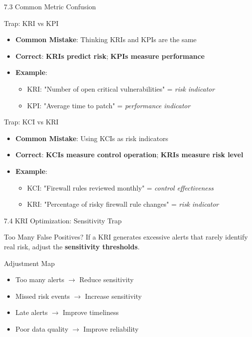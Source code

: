 \documentclass{beamer}
\begin{document}
	\begin{frame}{7.3 Common Metric Confusion}
		\begin{block}{Trap: KRI vs KPI}
			\begin{itemize}
				\item \textbf{Common Mistake}: Thinking KRIs and KPIs are the same
				\item \textbf{Correct}: \textbf{KRIs predict risk}; \textbf{KPIs measure performance}
				\item \textbf{Example}: 
				\begin{itemize}
					\item KRI: "Number of open critical vulnerabilities" = \textit{risk indicator}
					\item KPI: "Average time to patch" = \textit{performance indicator}
				\end{itemize}
			\end{itemize}
		\end{block}
		
		\begin{block}{Trap: KCI vs KRI}
			\begin{itemize}
				\item \textbf{Common Mistake}: Using KCIs as risk indicators
				\item \textbf{Correct}: \textbf{KCIs measure control operation}; \textbf{KRIs measure risk level}
				\item \textbf{Example}:
				\begin{itemize}
					\item KCI: "Firewall rules reviewed monthly" = \textit{control effectiveness}
					\item KRI: "Percentage of risky firewall rule changes" = \textit{risk indicator}
				\end{itemize}
			\end{itemize}
		\end{block}
	\end{frame}
	
	\begin{frame}{7.4 KRI Optimization: Sensitivity Trap}
		\begin{block}{Too Many False Positives?}
			If a KRI generates excessive alerts that rarely identify real risk, adjust the \textbf{sensitivity thresholds}.
		\end{block}
		
		\begin{alertblock}{Adjustment Map}
			\begin{itemize}
				\item Too many alerts $\rightarrow$ Reduce sensitivity
				\item Missed risk events $\rightarrow$ Increase sensitivity
				\item Late alerts $\rightarrow$ Improve timeliness
				\item Poor data quality $\rightarrow$ Improve reliability
			\end{itemize}
		\end{alertblock}
	\end{frame}
	
\end{document}
